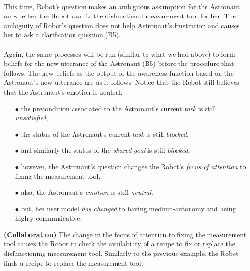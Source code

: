 \noindent{}\\

This time, Robot's question makes an ambiguous assumption for the Astronaut on
whether the Robot can fix the disfunctional measurement tool for her. The
ambiguity of Robot's question does not help Astronaut's frustration and causes
her to ask a clarification question (B5).\\

\noindent{}\\

Again, the same processes will be run (similar to what we had above) to form
beliefs for the new utterance of the Astronaut (B5) before the procedure that
follows. The new beliefs as the output of the awareness function based on the
Astronaut's new utterance are as it follows. Notice that the Robot still
believes that the Astronaut's emotion is neutral.

\begin{itemize}
  \item[$\bullet$] the precondition associated to the Astronaut's current
  \textit{task} is still \textit{unsatisfied},
  \item[$\bullet$] the status of the Astronaut's current \textit{task} is still
  \textit{blocked},
  \item[$\bullet$] and similarly the status of the \textit{shared goal} is
  still \textit{blocked},
  \item[$\bullet$] however, the Astronaut's question changes the Robot's
  \textit{focus of attention} to fixing the measurement tool,
  \item[$\bullet$] also, the Astronaut's \textit{emotion} is still
  \textit{neutral}.
  \item[$\bullet$] but, her user model \textit{has changed} to having
  medium-autonomy and being highly communicative.
\end{itemize}

\noindent\textbf{(Collaboration)} The change in the focus of attention to fixing
the measurement tool causes the Robot to check the availability of a recipe to
fix or replace the disfunctioning measurement tool. Similarly to the previous
example, the Robot finds a recipe to replace the measurement tool.\\

